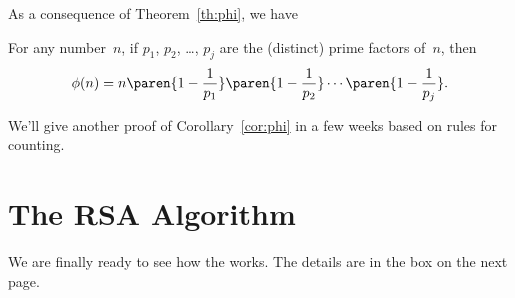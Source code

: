 As a consequence of Theorem~\ref{th:phi}, we have
\begin{corollary}\label{cor:phi}
For any number~$n$, if $p_1$, $p_2$, \dots, $p_j$ are the (distinct)
prime factors of~$n$, then
\begin{equation*}
    \phi(n) =  n \paren{1 - \frac{1}{p_1}}
                 \paren{1 - \frac{1}{p_2}}
                 \cdots
                 \paren{1 - \frac{1}{p_j}}.
 \end{equation*}
\end{corollary}
We'll give another proof of Corollary~\ref{cor:phi} in a few weeks
based on rules for counting.

\iffalse
are all those of the form
$mp$.  For $mp$ to be in the interval, $m$ can take any value from 0 to
$p^{k-1}-1$ and no others, so there are exactly $p^{k-1}$ numbers in the
interval that are divisible by $p$.  Now $\phi(p^{k})$ equals the number
of remaining elements in the interval, namely, $p^k -p^{k-1}$.
\fi

\begin{problems}
\practiceproblems
{}

\classproblems
{}

\homeworkproblems
{}

\examproblems
{}
\end{problems}


\section{The RSA Algorithm}\label{RSA_sec}
We are finally ready to see how the  works.  The details are in the box on the next page.

